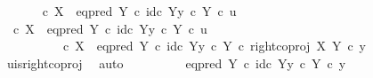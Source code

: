 \begin{isabellebody}
\ \ \isamarkupfalse%
\ {\isachardoublequoteopen}{\isasymt}\ {\isacharequal}{\kern0pt}\ {\isacharparenleft}{\kern0pt}{\isasymf}\ {\isasymcirc}\isactrlsub c\ {\isasymbeta}\isactrlbsub X\isactrlesub {\isacharparenright}{\kern0pt}\ {\isasymamalg}\ {\isacharparenleft}{\kern0pt}eq{\isacharunderscore}{\kern0pt}pred\ Y\ {\isasymcirc}\isactrlsub c\ {\isasymlangle}id\isactrlsub c\ Y{\isacharcomma}{\kern0pt}y\ {\isasymcirc}\isactrlsub c\ {\isasymbeta}\isactrlbsub Y\isactrlesub {\isasymrangle}{\isacharparenright}{\kern0pt}\ {\isasymcirc}\isactrlsub c\ u{\isachardoublequoteclose}\isanewline
\ \ \isamarkupfalse%
\ {\isacharminus}{\kern0pt}\isanewline
\ \ \ \ \isamarkupfalse%
\ {\isachardoublequoteopen}{\isacharparenleft}{\kern0pt}{\isasymf}\ {\isasymcirc}\isactrlsub c\ {\isasymbeta}\isactrlbsub X\isactrlesub {\isacharparenright}{\kern0pt}\ {\isasymamalg}\ {\isacharparenleft}{\kern0pt}eq{\isacharunderscore}{\kern0pt}pred\ Y\ {\isasymcirc}\isactrlsub c\ {\isasymlangle}id\isactrlsub c\ Y{\isacharcomma}{\kern0pt}y\ {\isasymcirc}\isactrlsub c\ {\isasymbeta}\isactrlbsub Y\isactrlesub {\isasymrangle}{\isacharparenright}{\kern0pt}\ {\isasymcirc}\isactrlsub c\ u\isanewline
\ \ \ \ \ \ \ \ {\isacharequal}{\kern0pt}\ {\isacharparenleft}{\kern0pt}{\isasymf}\ {\isasymcirc}\isactrlsub c\ {\isasymbeta}\isactrlbsub X\isactrlesub {\isacharparenright}{\kern0pt}\ {\isasymamalg}\ {\isacharparenleft}{\kern0pt}eq{\isacharunderscore}{\kern0pt}pred\ Y\ {\isasymcirc}\isactrlsub c\ {\isasymlangle}id\isactrlsub c\ Y{\isacharcomma}{\kern0pt}y\ {\isasymcirc}\isactrlsub c\ {\isasymbeta}\isactrlbsub Y\isactrlesub {\isasymrangle}{\isacharparenright}{\kern0pt}\ {\isasymcirc}\isactrlsub c\ right{\isacharunderscore}{\kern0pt}coproj\ X\ Y\ {\isasymcirc}\isactrlsub c\ y{\isachardoublequoteclose}\isanewline
\ \ \ \ \ \ \isamarkupfalse%
\ u{\isacharunderscore}{\kern0pt}is{\isacharunderscore}{\kern0pt}right{\isacharunderscore}{\kern0pt}coproj\ \isamarkupfalse%
\ auto\isanewline
\ \ \ \ \isamarkupfalse%
\ \isamarkupfalse%
\ {\isachardoublequoteopen}{\isachardot}{\kern0pt}{\isachardot}{\kern0pt}{\isachardot}{\kern0pt}\ {\isacharequal}{\kern0pt}\ {\isacharparenleft}{\kern0pt}eq{\isacharunderscore}{\kern0pt}pred\ Y\ {\isasymcirc}\isactrlsub c\ {\isasymlangle}id\isactrlsub c\ Y{\isacharcomma}{\kern0pt}y\ {\isasymcirc}\isactrlsub c\ {\isasymbeta}\isactrlbsub Y\isactrlesub {\isasymrangle}{\isacharparenright}{\kern0pt}\ {\isasymcirc}\isactrlsub c\ y{\isachardoublequoteclose}\isanewline
\ \ \ \ \ \ \isamarkupfalse%

\end{isabellebody}
